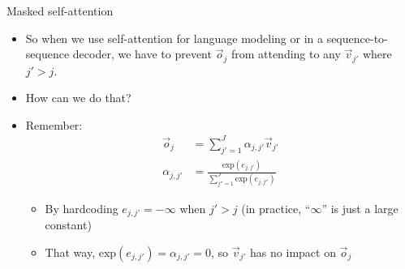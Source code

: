 \begin{vbframe}{Masked self-attention}

\vfill

\begin{itemize}
\item So when we use self-attention for language modeling or in a sequence-to-sequence decoder, we have to prevent $\vec o_j$ from attending to any $\vec v_{j'}$ where $j' > j$.
\item \ques How can we do that?
\item Remember:
$$ \begin{aligned}
\vec o_j & = \sum_{j' = 1}^{J} \alpha_{j,j'} \vec v_{j'} \\
 \alpha_{j,j'} & = \frac{\mathrm{exp}(e_{j,j'})}{\sum_{j'' = 1}^J \mathrm{exp}(e_{j,j''})}
\end{aligned}
$$
\begin{itemize}
\item By hardcoding $e_{j,j'} = -\infty$ when $j' > j$ (in practice, ``$\infty$'' is just a large constant)
\item That way, $\mathrm{exp}(e_{j,j'}) = \alpha_{j,j'} = 0$, so $\vec v_{j'}$ has no impact on $\vec o_j$
\end{itemize}
\end{itemize}

\vfill

\end{vbframe}


